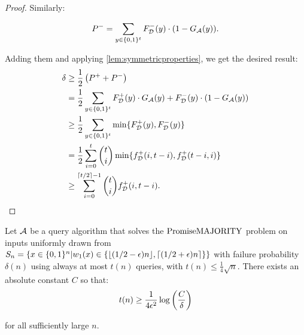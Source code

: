 \begin{proof}
Similarly:

$$
P^- = \sum_{y \in \{0, 1\}^t} F^-_{\mathcal{D}}(y) \cdot (1-G_{\mathcal{A}}(y)).
$$

Adding them and applying \cref{lem:symmetricproperties}, we get the desired result:
\begin{align*}
\delta & \geq \frac{1}{2}\left(P^+ + P^-\right) \\
        & = \frac{1}{2}\sum_{y \in \{0, 1\}^t} F^+_{\mathcal{D}}(y) \cdot G_{\mathcal{A}}(y) + F^-_{\mathcal{D}}(y) \cdot (1-G_{\mathcal{A}}(y)) \\ 
        & \geq \frac{1}{2}\sum_{y \in \{0, 1\}^t} \min \{F^+_{\mathcal{D}}(y), F^-_{\mathcal{D}}(y)\} \\
        & = \frac{1}{2}\sum_{i=0}^{t} \binom{t}{i} \min \{f^+_{\mathcal{D}}(i, t-i), f^+_{\mathcal{D}}(t-i, i)\} \\
        & \geq \sum_{i=0}^{\lceil t/2 \rceil-1} \binom{t}{i} f^+_{\mathcal{D}}(i, t-i).
\end{align*}

\end{proof}

\begin{theorem}
\label{thm:querylb}
Let $\mathcal{A}$ be a query algorithm that solves the $\mathrm{PromiseMAJORITY}$ problem on inputs uniformly drawn from 
$S_n = \{x \in \{0, 1\}^n | w_1(x) \in \{\lfloor(1/2-\epsilon)n\rfloor, \lceil(1/2+\epsilon)n\rceil\}\}$ 
with failure probability $\delta(n)$ using always at most $t(n)$ queries, with $t(n) \leq \frac{1}{4}\sqrt{n}$. 
There exists an absolute constant $C$ so that: 
$$
t(n) \geq \frac{1}{4\epsilon^2} \log \left(\frac{C}{\delta}\right)
$$

for all sufficiently large $n$.
\end{theorem}

